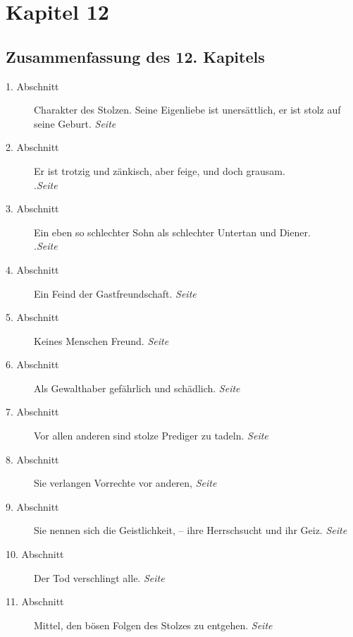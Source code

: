 
\chapter{Kapitel 12} \label{kap12}

\section{Zusammenfassung des 12. Kapitels}

\begin{description}
\item[1. Abschnitt] Charakter des Stolzen. Seine Eigenliebe ist unersättlich,
er
ist stolz auf seine Geburt.
\dotfill \textit{Seite~\pageref{kap12_ab1}}\\
\item[2. Abschnitt] Er ist trotzig und zänkisch, aber feige, und doch grausam.\\
.\dotfill \textit{Seite~\pageref{kap12_ab2}}\\
\item[3. Abschnitt] Ein eben so schlechter Sohn als schlechter Untertan und
Diener.\\
.\dotfill \textit{Seite~\pageref{kap12_ab3}}\\
\item[4. Abschnitt] Ein Feind der Gastfreundschaft.
\dotfill \textit{Seite~\pageref{kap12_ab4}}\\
\item[5. Abschnitt] Keines Menschen Freund.
\dotfill \textit{Seite~\pageref{kap12_ab5}}\\
\item[6. Abschnitt] Als Gewalthaber gefährlich und schädlich.
\dotfill \textit{Seite~\pageref{kap12_ab6}}\\
\item[7. Abschnitt] Vor allen anderen sind stolze Prediger zu tadeln.
\dotfill \textit{Seite~\pageref{kap12_ab7}}\\
\item[8. Abschnitt] Sie verlangen Vorrechte vor anderen,
\dotfill \textit{Seite~\pageref{kap12_ab8}}\\
\item[9. Abschnitt] Sie nennen sich die
Geistlichkeit, --
ihre Herrschsucht und ihr Geiz.
\dotfill \textit{Seite~\pageref{kap12_ab9}}\\
\item[10. Abschnitt] Der Tod verschlingt alle.
\dotfill \textit{Seite~\pageref{kap12_ab10}}\\
\item[11. Abschnitt] Mittel, den bösen Folgen des Stolzes zu entgehen.
\dotfill \textit{Seite~\pageref{kap12_ab11}}\\
\end{description}

